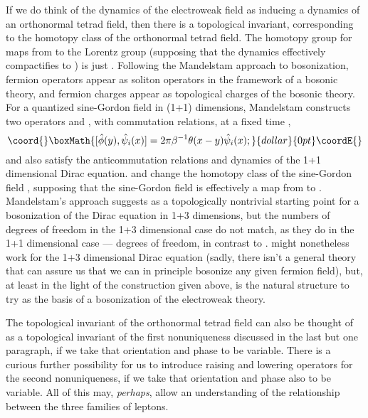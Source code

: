 \documentclass[a4paper,twocolumn,showpacs,preprintnumbers,aps]{revtex4}
\begin{document}
If we do think of the dynamics of the electroweak field as inducing a dynamics
of an orthonormal tetrad field, then there is a topological invariant, corresponding
to the homotopy class of the orthonormal tetrad field. The homotopy group for
maps from \coordHE{} to the Lorentz group (supposing that the dynamics effectively
compactifies \coordHE{} to \coordHE{}) is just \ZZ. Following the Mandelstam approach
to bosonization\cite{Mandelstam}, fermion operators appear as soliton operators
in the framework of a bosonic theory, and fermion charges appear as topological
charges of the bosonic theory\cite{Marino}. 
For a quantized sine-Gordon field \coordHE{} in (1+1) dimensions, Mandelstam
constructs two operators \coordHE{} and \coordHE{}, with commutation
relations, at a fixed time \coordHE{},
$$\coord{}\boxMath{[\hat\phi(y),\hat\psi_i(x)]=2\pi\beta^{-1}\theta(x-y)\hat\psi_i(x);}{dollar}{0pt}\coordE{}$$  \coordHE{} and \coordHE{} also satisfy the anticommutation relations
and dynamics of the 1+1 dimensional Dirac equation. \coordHE{} and
\coordHE{} change the homotopy class of the sine-Gordon field
\coordHE{}, supposing that the sine-Gordon field is effectively a map
from \coordHE{} to \coordHE{}. Mandelstam's approach suggests
\coordHE{} as a topologically nontrivial starting point for a bosonization of the Dirac
equation in 1+3 dimensions, but the numbers of degrees of freedom in the 1+3
dimensional case do not match, as they do in the 1+1 dimensional case ---
\coordHE{} degrees of freedom, in contrast to \coordHE{}. \coordHE{} might
nonetheless work for the 1+3 dimensional Dirac equation (sadly, there isn't a general
theory that can assure us that we can in principle bosonize any given fermion field),
but, at least in the light of the construction given above, \coordHE{} is the natural
structure to try as the basis of a bosonization of the electroweak theory.

The topological invariant of the orthonormal tetrad field can also be thought of as a
topological invariant of the first \coordHE{} nonuniqueness discussed in the last but one
paragraph, if we take that \coordHE{} orientation and phase to be variable. There is a
curious further possibility for us to introduce raising and lowering operators for the
second \coordHE{} nonuniqueness, if we take that \coordHE{} orientation and phase also
to be variable. All of this may, \emph{perhaps}, allow an understanding of the
relationship between the three families of leptons.
\end{document}
